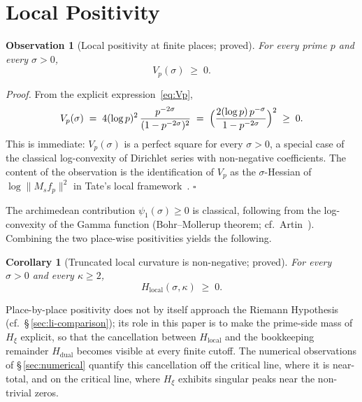 \documentclass[11pt]{article}
\newtheorem{corollary}[theorem]{Corollary}
\newtheorem{observation}[theorem]{Observation}
\newcommand{\Hxi}{H_{\xi}}
\newcommand{\Hlocal}{H_{\mathrm{local}}}
\newcommand{\Hdual}{H_{\mathrm{dual}}}
\begin{document}
\section{Local Positivity}
\label{sec:positivity}

\begin{observation}[Local positivity at finite places; proved]
\label{obs:Vp-pos}
For every prime $p$ and every $\sigma>0$,
\[
V_p(\sigma)\;\ge\;0.
\]
\end{observation}

\emph{Proof.}
From the explicit expression~\eqref{eq:Vp},
\[
V_p(\sigma)\;=\;4(\log p)^{2}\,
\frac{p^{-2\sigma}}{(1-p^{-2\sigma})^{2}}
\;=\;\Bigl(\frac{2(\log p)\,p^{-\sigma}}{1-p^{-2\sigma}}
\Bigr)^{2}\;\ge\;0.
\]
This is immediate: $V_p(\sigma)$ is a perfect square for every
$\sigma>0$, a special case of the classical log-convexity
of Dirichlet series with non-negative coefficients.
The content of the observation is the identification of
$V_p$ as the $\sigma$-Hessian of $\log\lVert M_s f_p\rVert^2$
in Tate's local framework~\cite{Tate1967}.
\hfill$\square$

\medskip
The archimedean contribution $\psi_1(\sigma)\ge 0$ is
classical, following from the log-convexity of the Gamma
function (Bohr--Mollerup theorem; cf.\ Artin~\cite{Artin}).
Combining the two place-wise positivities yields the
following.

\begin{corollary}[Truncated local curvature is non-negative;
                  proved]
\label{cor:Hlocal-pos}
For every $\sigma>0$ and every $\kappa\ge 2$,
\[
\Hlocal(\sigma,\kappa)\;\ge\;0.
\]
\end{corollary}

\medskip
Place-by-place positivity does not by itself approach the
Riemann Hypothesis (cf.\ \S\,\ref{sec:li-comparison}); its
role in this paper is to make the prime-side mass of $\Hxi$
explicit, so that the cancellation between $\Hlocal$ and the
bookkeeping remainder $\Hdual$ becomes visible at every finite
cutoff.
The numerical observations of \S\,\ref{sec:numerical}
quantify this cancellation off the critical line, where it is
near-total, and on the critical line, where $\Hxi$ exhibits
singular peaks near the non-trivial zeros.

\end{document}
